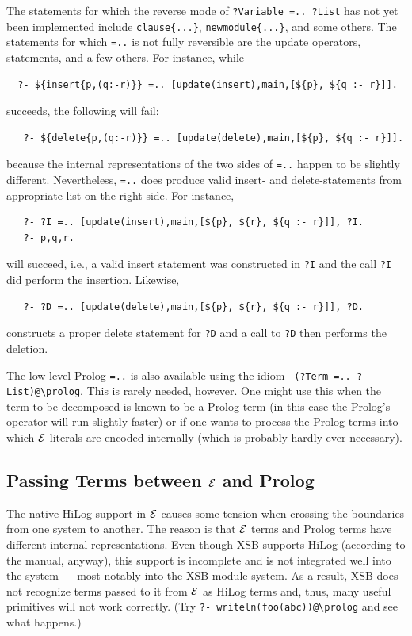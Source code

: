 \documentclass[11pt]{article}
\newcommand{\ERGO}{\mbox{\ensuremath{\cal{E}}\smaller{{\sc{RGO}}}}\xspace}
\newcommand{\FLSYSTEM}{\ERGO}
\newcommand{\bs}{\textbackslash}
\begin{document}
The statements for which the reverse mode of \texttt{?Variable =.. ?List}
has not yet been
implemented include \texttt{clause\{...\}},  \texttt{newmodule\{...\}},
and some others. The
statements for which \texttt{=..} is not fully reversible are the update
operators, statements, and a few others. For instance, while
\begin{verbatim}
  ?- ${insert{p,(q:-r)}} =.. [update(insert),main,[${p}, ${q :- r}]].
\end{verbatim}
succeeds, the following will fail:
\begin{verbatim}
   ?- ${delete{p,(q:-r)}} =.. [update(delete),main,[${p}, ${q :- r}]].
\end{verbatim}
because the internal representations of the two sides of \texttt{=..}
happen to be slightly different. 
Nevertheless, \texttt{=..} does produce valid insert- and
delete-statements from appropriate list on the right side. For instance,
\begin{verbatim}
   ?- ?I =.. [update(insert),main,[${p}, ${r}, ${q :- r}]], ?I.
   ?- p,q,r.
\end{verbatim}
will succeed, i.e., a valid insert statement was constructed in \texttt{?I}
and the call \texttt{?I} did perform the insertion. Likewise,
\begin{verbatim}
   ?- ?D =.. [update(delete),main,[${p}, ${r}, ${q :- r}]], ?D.
\end{verbatim}
constructs a proper delete statement for \texttt{?D} and a call to
\texttt{?D} then performs the deletion.  


The low-level Prolog {\tt =..} is also available using the idiom {\tt
  (?Term =.. ?List)@\bs{}prolog}.  This is rarely needed, however. One
might use this when the term to be decomposed is known to be a Prolog term
(in this case the Prolog's operator will run slightly faster) or if one
wants to process the Prolog terms into which \FLSYSTEM literals are encoded
internally (which is probably hardly ever necessary).


\subsection{Passing Terms between \FLSYSTEM and Prolog}\label{sec-passing-args}

The native HiLog support in \FLSYSTEM causes some tension when crossing the
boundaries from one system to another. The reason is that \FLSYSTEM terms and Prolog
terms have different internal representations. Even though XSB supports
HiLog (according to the manual, anyway), this support is incomplete and is
not integrated well into the system --- most notably into the XSB module
system. As a result, XSB does not recognize terms passed to it from \FLSYSTEM
as HiLog terms and, thus, many useful primitives will not work correctly.
(Try {\tt ?- writeln(foo(abc))@\bs{}prolog} and see what happens.)
\end{document}
